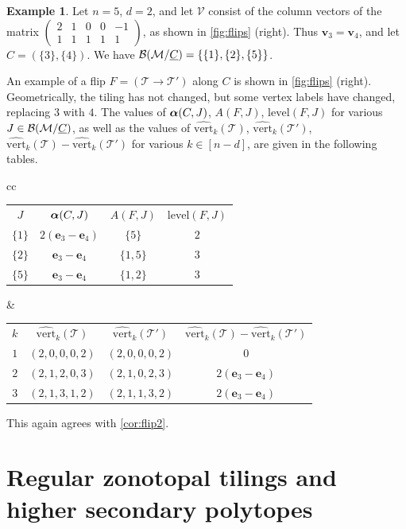 \documentclass[11pt]{amsart}
\theoremstyle{plain}
\theoremstyle{definition}
\newtheorem{example}[theorem]{Example}
\def\v{{\bm{v}}}
\def\V{\mathcal{V}}
\def\e{{\bm{e}}}
\def\level{\mathrm{level}}
\newcommand\wh[1]{\hstretch{2}{\hat{\hstretch{0.5}{#1}}}}
\def\vert{\mathrm{vert}}
\def\vertHSP{\wh\vert}
\def\vertHSP{\widehat{\vert}}
\def\VC{\V}
\def\Tcal{\mathcal{T}}
\def\Tiling{\Tcal}
\begin{document}
\begin{example}
\def\vectt#1#2#3#4#5{(#1,#2,#3,#4,#5)}
Let $n=5$, $d=2$, and let $\VC$ consist of the column vectors of the matrix $\begin{pmatrix}
2 & 1 & 0&0 &-1\\
1 & 1 & 1&1 & 1
\end{pmatrix}$, as shown in 
\cref{fig:flips} (right). 
Thus $\v_3=\v_4$, and let $C=(\{3\},\{4\})$. We have $\mathcal{B}(\mathcal{M}/{\underline{C}})=\{\{1\},\{2\},\{5\}\}$.

 An example of a flip $F=(\Tiling\to \Tiling')$ along $C$ is shown in 
	\cref{fig:flips} (right). 
	Geometrically, the tiling has not changed, but some vertex labels have changed, replacing $3$ with $4$. The values of $\bm{\alpha}(C,J)$, $A(F,J)$, $\level(F,J)$ for various $J\in\mathcal{B}(\mathcal{M}/{\underline{C}})$, as well as the values of $\vertHSP_k(\Tiling)$, $\vertHSP_k(\Tiling')$, $\vertHSP_k(\Tiling)-\vertHSP_k(\Tiling')$ for various $k\in[n-d]$, are given in the following tables.
	\begin{center}
\begin{tabular}{cc}
\begin{tabular}{|c|c|c|c|}\hline
$J$ & $\bm{\alpha}(C,J)$ & $A(F,J)$ & $\level(F,J)$\\\hhline{|=|=|=|=|}
$\{1\}$ & $2(\e_3-\e_4)$ & $\{5\}$ & $2$\\\hline
$\{2\}$ & $\e_3-\e_4$ & $\{1,5\}$ &$3$\\\hline
$\{5\}$ & $\e_3-\e_4$ & $\{1,2\}$ &$3$\\\hline
\end{tabular}
&
\begin{tabular}{|c|c|c|c|}\hline
$k$ & $\vertHSP_k(\Tiling)$& $\vertHSP_k(\Tiling')$& $\vertHSP_k(\Tiling)-\vertHSP_k(\Tiling')$\\\hhline{|=|=|=|=|}
$1$ & $\vectt20002$ & $\vectt20002$ & $0$ \\\hline
$2$ & $\vectt21203$ & $\vectt21023$ & $2(\e_3-\e_4)$ \\\hline
$3$ & $\vectt21312$ & $\vectt21132$ & $2(\e_3-\e_4)$ \\\hline
\end{tabular}
\end{tabular}
\end{center}
\noindent This again agrees with \cref{cor:flip2}.
\end{example}





\section{Regular zonotopal tilings and higher secondary polytopes}\label{sec:regular}
\end{document}
